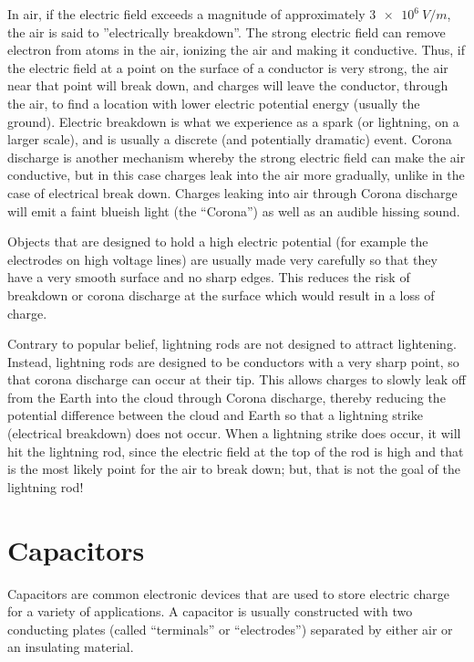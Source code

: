 In air, if the electric field exceeds a magnitude of approximately $\SI{3e6}{V/m}$, the air is said to ''electrically breakdown''. The strong electric field can remove electron from atoms in the air, ionizing the air and making it conductive. Thus, if the electric field at a point on the surface of a conductor is very strong, the air near that point will break down, and charges will leave the conductor, through the air, to find a location with lower electric potential energy (usually the ground). Electric breakdown is what we experience as a spark (or lightning, on a larger scale), and is usually a discrete (and potentially dramatic) event. Corona discharge is another mechanism whereby the strong electric field can make the air conductive, but in this case charges leak into the air more gradually, unlike in the case of electrical break down. Charges leaking into air through Corona discharge will emit a faint blueish light (the ``Corona'') as well as an audible hissing sound.

Objects that are designed to hold a high electric potential (for example the electrodes on high voltage lines) are usually made very carefully so that they have a very smooth surface and no sharp edges. This reduces the risk of breakdown or corona discharge at the surface which would result in a loss of charge.

Contrary to popular belief, lightning rods are not designed to attract lightening. Instead, lightning rods are designed to be conductors with a very sharp point, so that corona discharge can occur at their tip. This allows charges to slowly leak off from the Earth into the cloud through Corona discharge, thereby reducing the potential difference between the cloud and Earth so that a lightning strike (electrical breakdown) does not occur. When a lightning strike does occur, it will hit the lightning rod, since the electric field at the top of the rod is high and that is the most likely point for the air to break down; but, that is not the goal of the lightning rod!
\section{Capacitors}
Capacitors are common electronic devices that are used to store electric charge for a variety of applications. A capacitor is usually constructed with two conducting plates (called ``terminals'' or ``electrodes'') separated by either air or an insulating material.

